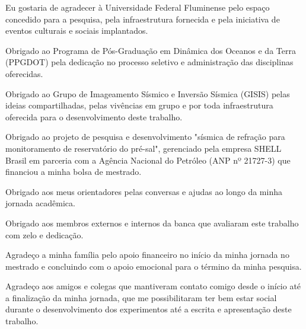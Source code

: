 \begin{agradecimentos}
    \fonteAgradecimentos 
    
	Eu gostaria de agradecer à Universidade Federal Fluminense pelo espaço concedido para a pesquisa, pela infraestrutura fornecida e pela iniciativa de eventos culturais e sociais implantados. 
	
	Obrigado ao Programa de Pós-Graduação em Dinâmica dos Oceanos e da Terra (PPGDOT) pela dedicação no processo seletivo e administração das disciplinas oferecidas. 
	
	Obrigado ao Grupo de Imageamento Sísmico e Inversão Sísmica (GISIS) pelas ideias compartilhadas, pelas vivências em grupo e por toda infraestrutura oferecida para o desenvolvimento deste trabalho. 
	
	Obrigado ao projeto de pesquisa e desenvolvimento "sísmica de refração para monitoramento de reservatório do pré-sal", gerenciado pela empresa SHELL Brasil em parceria com a Agência Nacional do Petróleo (ANP nº 21727-3) que financiou a minha bolsa de mestrado. 
	
	Obrigado aos meus orientadores pelas conversas e ajudas ao longo da minha jornada acadêmica. 
	
	Obrigado aos membros externos e internos da banca que avaliaram este trabalho com zelo e dedicação. 
	
	Agradeço a minha família pelo apoio financeiro no início da minha jornada no mestrado e concluindo com o apoio emocional para o término da minha pesquisa. 
	
	Agradeço aos amigos e colegas que mantiveram contato comigo desde o início até a finalização da minha jornada, que me possibilitaram ter bem estar social durante o desenvolvimento dos experimentos até a escrita e apresentação deste trabalho.         
    
\end{agradecimentos}